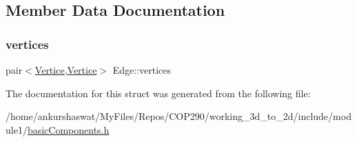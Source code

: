 \subsection{Member Data Documentation}
\mbox{\label{structEdge_adb182142702f93f85a3f41c86f4916ff}} 
\subsubsection{\texorpdfstring{vertices}{vertices}}
{\footnotesize\ttfamily pair$<$\hyperlink{structVertice}{Vertice},\hyperlink{structVertice}{Vertice}$>$ Edge\+::vertices}



The documentation for this struct was generated from the following file\+:\begin{DoxyCompactItemize}
\item 
/home/ankurshaswat/\+My\+Files/\+Repos/\+C\+O\+P290/working\+\_\+3d\+\_\+to\+\_\+2d/include/module1/\hyperlink{basicComponents_8h}{basic\+Components.\+h}\end{DoxyCompactItemize}
